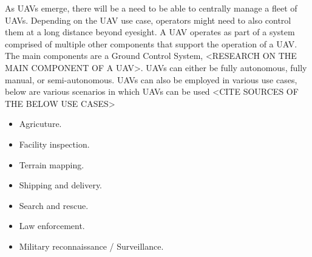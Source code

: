 As UAVs emerge, there will be a need to be able to centrally manage a fleet of UAVs. Depending on the UAV use case, operators might need to also control them at a long distance beyond eyesight. A UAV operates as part of a system comprised of multiple other components that support the operation of a UAV. The main components are a Ground Control System, <RESEARCH ON THE MAIN COMPONENT OF A UAV>. UAVs can either be fully autonomous, fully manual, or semi-autonomous. UAVs can also be employed in various use cases, below are various scenarios in which UAVs can be used <CITE SOURCES OF THE BELOW USE CASES>
\begin{itemize}
    \item Agricuture.
    \item Facility inspection.
    \item Terrain mapping.
    \item Shipping and delivery.
    \item Search and rescue.
    \item Law enforcement.
    \item Military reconnaissance / Surveillance.
\end{itemize}

